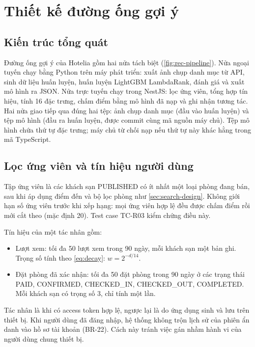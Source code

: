 \section{Thiết kế đường ống gợi ý}\label{sec:rec-design}

\subsection{Kiến trúc tổng quát}

Đường ống gợi ý của Hotelia gồm hai nửa tách biệt (\cref{fig:rec-pipeline}). Nửa ngoại tuyến chạy bằng Python trên máy phát triển: xuất ảnh chụp danh mục từ API, sinh dữ liệu huấn luyện, huấn luyện LightGBM LambdaRank, đánh giá và xuất mô hình ra JSON. Nửa trực tuyến chạy trong NestJS: lọc ứng viên, tổng hợp tín hiệu, tính 16 đặc trưng, chấm điểm bằng mô hình đã nạp và ghi nhận tương tác. Hai nửa giao tiếp qua đúng hai tệp: ảnh chụp danh mục (đầu vào huấn luyện) và tệp mô hình  (đầu ra huấn luyện, được commit cùng mã nguồn máy chủ). Tệp mô hình chứa thứ tự đặc trưng; máy chủ từ chối nạp nếu thứ tự này khác hằng  trong mã TypeScript.


\subsection{Lọc ứng viên và tín hiệu người dùng}

Tập ứng viên là các khách sạn PUBLISHED có ít nhất một loại phòng đang bán, sau khi áp dụng điểm đến và bộ lọc phòng như \cref{sec:search-design}. Không giới hạn số ứng viên trước khi xếp hạng: mọi ứng viên hợp lệ đều được chấm điểm rồi mới cắt theo  (mặc định 20). Test case TC-R03 kiểm chứng điều này.

Tín hiệu của một tác nhân gồm:
\begin{itemize}
\item Lượt xem: tối đa 50 lượt xem trong 90 ngày, mỗi khách sạn một bản ghi. Trọng số tính theo \cref{eq:decay}: $w = 2^{-d/14}$.
\item Đặt phòng đã xác nhận: tối đa 50 đặt phòng trong 90 ngày ở các trạng thái PAID, CONFIRMED, CHECKED\_IN, CHECKED\_OUT, COMPLETED. Mỗi khách sạn có trọng số 3, chỉ tính một lần.
\end{itemize}
Tác nhân là  khi có access token hợp lệ, ngược lại là  do ứng dụng sinh và lưu trên thiết bị. Khi người dùng đã đăng nhập, hệ thống không trộn lịch sử của phiên ẩn danh vào hồ sơ tài khoản (BR-22). Cách này tránh việc gán nhầm hành vi của người dùng chung thiết bị.

